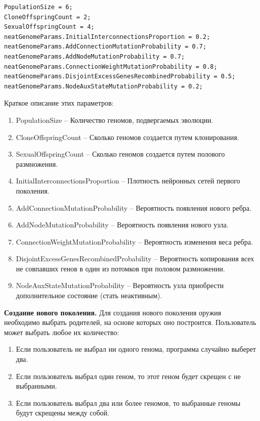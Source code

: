 \begin{lstlisting}[caption={Params}]
PopulationSize = 6;
CloneOffspringCount = 2;
SexualOffspringCount = 4;
neatGenomeParams.InitialInterconnectionsProportion = 0.2;
neatGenomeParams.AddConnectionMutationProbability = 0.7;
neatGenomeParams.AddNodeMutationProbability = 0.7;
neatGenomeParams.ConnectionWeightMutationProbability = 0.8;
neatGenomeParams.DisjointExcessGenesRecombinedProbability = 0.5;
neatGenomeParams.NodeAuxStateMutationProbability = 0.2;
\end{lstlisting}
Краткое описание этих параметров:
\begin{enumerate}[label=\textbullet]
    \item PopulationSize -- Количество геномов, подвергаемых эволюции.
    \item CloneOffspringCount -- Сколько геномов создается путем клонирования.
    \item SexualOffspringCount -- Сколько геномов создается путем полового размножения.
    \item InitialInterconnectionsProportion -- Плотность нейронных сетей первого поколения.
    \item AddConnectionMutationProbability -- Вероятность появления нового ребра.
    \item AddNodeMutationProbability -- Вероятность появления нового узла.
    \item ConnectionWeightMutationProbability -- Вероятность изменения веса ребра.
    \item DisjointExcessGenesRecombinedProbability -- Вероятность копирования всех не совпавших генов в один из потомков при половом размножении.
    \item NodeAuxStateMutationProbability -- Вероятность узла приобрести дополнительное состояние (стать неактивным).
\end{enumerate}

\pagebreak

\textbf{Создание нового поколения.} Для создания нового поколения оружия необходимо выбрать родителей, на основе которых оно построится. Пользователь может выбрать любое их количество:

\begin{enumerate}[label=\textbullet]
    \item Если пользователь не выбрал ни одного генома, программа случайно выберет два.
    \item Если пользователь выбрал один геном, то этот геном будет скрещен с не выбранными.
    \item Если пользователь выбрал два или более геномов, то выбранные геномы будут скрещены между собой.
\end{enumerate}

